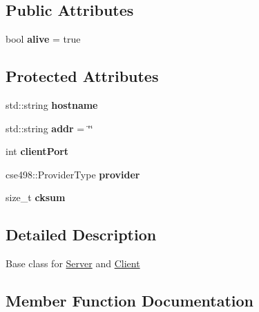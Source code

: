 \subsection*{Public Attributes}
\begin{DoxyCompactItemize}
\item 
\mbox{\label{classft_1_1Node_aecc8e36018ee507399fdc5e3f561a500}} 
bool {\bfseries alive} = true
\end{DoxyCompactItemize}
\subsection*{Protected Attributes}
\begin{DoxyCompactItemize}
\item 
\mbox{\label{classft_1_1Node_a46124887e675ddcd5bfdba6c4a015964}} 
std\+::string {\bfseries hostname}
\item 
\mbox{\label{classft_1_1Node_ac321a30ddc190fe5a3ec93869adaf82d}} 
std\+::string {\bfseries addr} = \char`\"{}\char`\"{}
\item 
\mbox{\label{classft_1_1Node_a520e4c96f13e8ce7cea0c8bf21b83c5f}} 
int {\bfseries client\+Port}
\item 
\mbox{\label{classft_1_1Node_a3f16f19902a912ce42a81439b6f4500e}} 
cse498\+::\+Provider\+Type {\bfseries provider}
\item 
\mbox{\label{classft_1_1Node_ab4561d8c56968bfe211550eeea205761}} 
size\+\_\+t {\bfseries cksum}
\end{DoxyCompactItemize}


\subsection{Detailed Description}
Base class for \mbox{\hyperlink{classft_1_1Server}{Server}} and \mbox{\hyperlink{classft_1_1Client}{Client}} 

\subsection{Member Function Documentation}
\mbox{\label{classft_1_1Node_aabbf4a7cd8fcea779622b65a4bf75e94}} 
